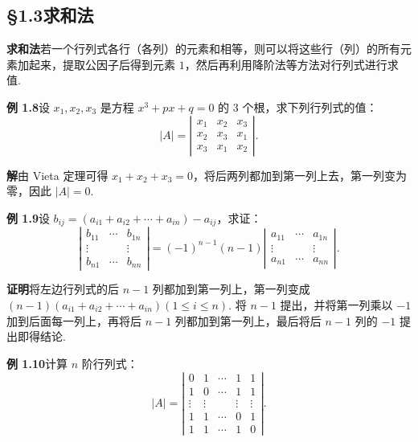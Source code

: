 \documentclass[UTF8,12pt,a4paper,fontset=fandol]{ctexart}
\begin{document}
\subsection*{§1.3\quad 求和法}

\noindent\textbf{求和法}\quad 若一个行列式各行（各列）的元素和相等，则可以将这些行（列）的所有元素加起来，提取公因子后得到元素 $1$，然后再利用降阶法等方法对行列式进行求值.

\noindent\textbf{例 1.8}\quad 设 $x_1,x_2,x_3$ 是方程 $x^3+px+q=0$ 的 3 个根，求下列行列式的值：
\[
|A|=\left|\begin{array}{ccc}
x_1 & x_2 & x_3\\
x_2 & x_3 & x_1\\
x_3 & x_1 & x_2
\end{array}\right|.
\]

\noindent\textbf{解}\quad 由 Vieta 定理可得 $x_1+x_2+x_3=0$，将后两列都加到第一列上去，第一列变为零，因此 $|A|=0$.

\noindent\textbf{例 1.9}\quad 设 $b_{ij}=(a_{i1}+a_{i2}+\cdots+a_{in})-a_{ij}$，求证：
\[
\left|\begin{array}{ccc}
b_{11} & \cdots & b_{1n}\\
\vdots &        & \vdots\\
b_{n1} & \cdots & b_{nn}
\end{array}\right|
=(-1)^{n-1}(n-1)
\left|\begin{array}{ccc}
a_{11} & \cdots & a_{1n}\\
\vdots &        & \vdots\\
a_{n1} & \cdots & a_{nn}
\end{array}\right|.
\]

\noindent\textbf{证明}\quad 将左边行列式的后 $n-1$ 列都加到第一列上，第一列变成 $(n-1)(a_{i1}+a_{i2}+\cdots+a_{in})(1\le i\le n)$. 将 $n-1$ 提出，并将第一列乘以 $-1$ 加到后面每一列上，再将后 $n-1$ 列都加到第一列上，最后将后 $n-1$ 列的 $-1$ 提出即得结论.

\noindent\textbf{例 1.10}\quad 计算 $n$ 阶行列式：
\[
|A|=\left|\begin{array}{ccccc}
0 & 1 & \cdots & 1 & 1\\
1 & 0 & \cdots & 1 & 1\\
\vdots & \vdots &        & \vdots & \vdots\\
1 & 1 & \cdots & 0 & 1\\
1 & 1 & \cdots & 1 & 0
\end{array}\right|.
\]
\end{document}
